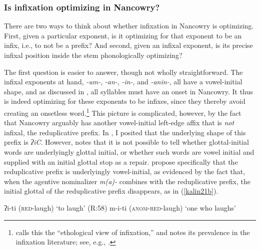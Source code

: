 \documentclass[output=paper]{langscibook}
\begin{document}
\subsubsection{Is infixation optimizing in Nancowry?}\label{kalinoptinf}\label{sec:kalin:4.3.2}\largerpage

There are two ways to think about whether infixation in Nancowry is optimizing. First, given a particular exponent, is it optimizing for that exponent to be an infix, i.e., to not be a prefix? And second, given an infixal exponent, is its precise infixal position inside the stem phonologically optimizing?

The first question is easier to answer, though not wholly straightforward. The infixal exponents at hand, \textit{-um-}, \textit{-an-}, \textit{-in-}, and \textit{-anin-}, all have a vowel-initial shape, and as discussed in , all syllables must have an onset in Nancowry. It thus is indeed optimizing for these exponents to be infixes, since they thereby avoid creating an onsetless word.\footnote{\citet[\S2.5.1]{Yu07} calls this the ``ethological view of infixation,'' and notes its prevalence in the infixation literature; see, e.g., \citealt{Anderson72,Cohn92,Buckley97}.} This picture is complicated, however, by the fact that Nancowry arguably has another vowel-initial left-edge affix that is \textit{not} infixal, the reduplicative prefix. In , I posited that the underlying shape of this prefix is \textit{ʔiC}. However, \citet[35]{Rad81} notes that it is not possible to tell whether glottal-initial words are underlyingly glottal initial, or whether such words are vowel initial and supplied with an initial glottal stop as a repair. \citet[348]{Alderete99} propose specifically that the reduplicative prefix is underlyingly vowel-initial, as evidenced by the fact that, when the agentive nominalizer \textit{m(a)-} combines with the reduplicative prefix, the initial glottal of the reduplicative prefix disappears, as in (\ref{kalin21b}).

\ea \ea ʔi-ti (\textsc{red-}laugh) \hfill `to laugh' (R:58)
\ex m-i-ti (\textsc{anom-red-}laugh) \hfill `one who laughs'\label{kalin21b}
\z
\z
\end{document}
